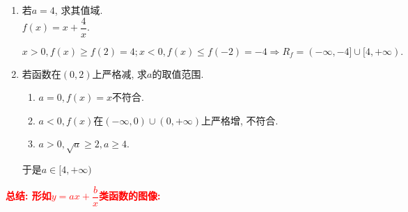 \documentclass[8pt]{article}
\begin{document}
\begin{enumerate}[label=(\arabic*)]
						\item 若$a=4$, 求其值域.
							~\\

							$f(x)=x+\dfrac{4}{x}.$

							$x>0, f(x)\geq f(2) = 4; x<0, f(x) \leq f(-2) = -4 \Rightarrow R_f = (-\infty, -4]\cup[4, +\infty).$

						\item 若函数在$(0, 2)$上严格减, 求$a$的取值范围.
							~\\

							\begin{enumerate}[label=${\arabic*}^{\circ}$]
								\item $a=0, f(x)=x$不符合.

								\item $a<0, f(x)$在$(-\infty, 0)\cup (0, +\infty)$上严格增, 不符合.

								\item $a>0, \sqrt{a} \geq 2, a \geq 4$.
							\end{enumerate}

							于是$a\in[4, +\infty)$

					\end{enumerate}

					\textbf{\textcolor{red}{总结: 形如$y=ax+\dfrac{b}{x}$类函数的图像:}}
\end{document}
